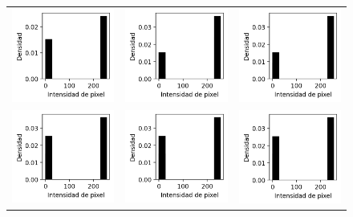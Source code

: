 \begin{figure}[!h]
    \centering
    \begin{tabular}{ccc}
        \includegraphics[width=4cm]{../Plots/THR/threshold_output_0.png} &
        \includegraphics[width=4cm]{../Plots/THR/threshold_output_1.png} &
        \includegraphics[width=4cm]{../Plots/THR/threshold_output_2.png} \\

        \includegraphics[width=4cm]{../Plots/THR/threshold_output_3.png} &
        \includegraphics[width=4cm]{../Plots/THR/threshold_output_4.png} &
        \includegraphics[width=4cm]{../Plots/THR/threshold_output_5.png} \\


\end{tabular}
\end{figure}
